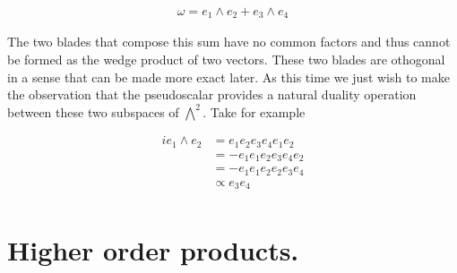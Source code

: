 \documentclass{article}
\begin{document}
\begin{align*}
\omega = e_1 \wedge e_2 + e_3 \wedge e_4
\end{align*}

The two blades that compose this sum have no common factors and thus cannot be formed as the wedge product of two vectors.  These two blades
are othogonal in a sense that can be made more exact later.   As this time we just wish to make the observation that 
the pseudoscalar provides a natural duality operation between these two subspaces of $\bigwedge^2$.  Take for example

\begin{align*}
i e_1 \wedge e_2 
&=
 e_1 e_2 e_3 e_4 e_1 e_2  \\
&=
- e_1 e_1 e_2 e_3 e_4 e_2  \\
&=
- e_1 e_1 e_2 e_2 e_3 e_4 \\
&\propto 
e_3 e_4 \\
\end{align*}

\section{ Higher order products. }

%
%
\end{document}
